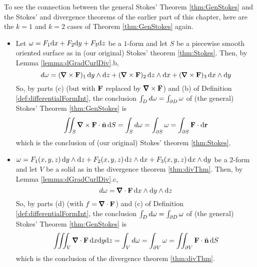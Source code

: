 To see the connection between the general Stokes' Theorem \ref{thm:GenStokes}
and the Stokes' and divergence theorems of the earlier part of this chapter, 
here are the $k=1$ and $k=2$ cases of Theorem \ref{thm:GenStokes} again.
\begin{itemize}
\item 
  Let $\omega = F_1 \mathrm{d}x + F_2 \mathrm{d}y + F_3 \mathrm{d}z$ be a $1$-form
and let $S$ be a piecewise smooth oriented surface as in (our original)
Stokes' theorem \ref{thm:Stokes}. Then, by Lemma \ref{lemma:dGradCurlDiv}.b,
\begin{equation*}
d\om = (\vnabla\times\vF)_1\,\dee{y}\wedge\dee{z}
   +(\vnabla\times\vF)_2\,\dee{z}\wedge\dee{x}
   +(\vnabla\times\vF)_3\,\dee{x}\wedge\dee{y}
\end{equation*}
So, by parts (c) (but with $\mathbf{F}$ replaced by $\vnabla\times\vF$) and (b)
of Definition \ref{def:differentialFormInt},
the conclusion $\int_D d\omega=\int_{\partial D}\omega$ of 
(the general) Stokes' Theorem \ref{thm:GenStokes} is
\begin{align*}
\dblInt_S \vnabla\times\vF\cdot\hn\,\dee{S}
=\int_S d\om=\int_{\partial S}\om
=\int_{\partial S}\vF\cdot\dee{\vr}
\end{align*}
which is the conclusion of (our original) Stokes' theorem \ref{thm:Stokes}.

\item 
  $\omega = F_1(x,y,z)\,\mathrm{d}y\wedge\mathrm{d}z
 + F_2(x,y,z)\,\mathrm{d}z\wedge\mathrm{d}x
 + F_3(x,y,z)\,\mathrm{d}x\wedge\mathrm{d}y$   
be a  $2$-form
and let $V$ be a solid as in the divergence theorem \ref{thm:divThm}. 
Then, by Lemma \ref{lemma:dGradCurlDiv}.c,
\begin{equation*}
d\om = \vnabla\cdot\vF\,\dee{x}\wedge\dee{y}\wedge\dee{z}
\end{equation*}
So, by parts (d) (with $f =\vnabla\cdot\vF$) and (c)
of Definition \ref{def:differentialFormInt},
the conclusion $\int_D d\omega=\int_{\partial D}\omega$ of 
(the general) Stokes' Theorem \ref{thm:GenStokes} is
\begin{align*}
\tripInt_V \vnabla\cdot\vF\,\dee{x}\dee{y}\dee{z} 
=\int_V d\om=\int_{\partial V}\om
=\dblInt_{\partial V}\vF\cdot\hn\,\dee{S}
\end{align*}
which is the conclusion of the divergence theorem \ref{thm:divThm}.




\end{itemize}












